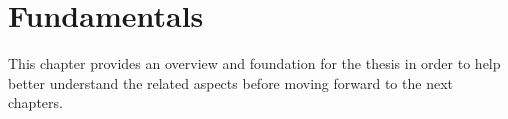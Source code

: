 \chapter{Fundamentals}
This chapter provides an overview and foundation for the thesis in order to help better understand the related aspects before moving forward to the next chapters.


